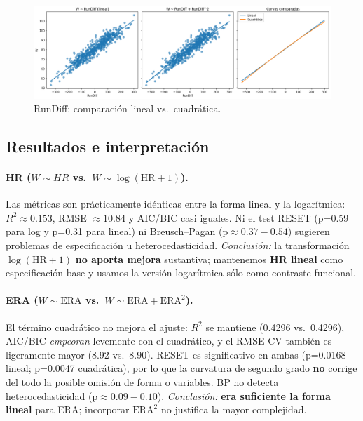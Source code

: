 \documentclass[man,floatsintext]{apa7}
\begin{document}
    \begin{figure}[H]\centering
    \includegraphics[width=\textwidth]{../plots/formas_funcionales_RunDiff.png}
    \caption{RunDiff: comparación lineal vs.\ cuadrática.}
    \label{fig:ff_rundiff}
\end{figure}

\subsection{Resultados e interpretación}

    \paragraph{HR (\(W \sim HR\) vs.\ \(W \sim \log(\text{HR}+1)\)).}
    Las métricas son prácticamente idénticas entre la forma lineal y la logarítmica: \(R^2 \approx 0.153\), RMSE \(\approx 10.84\) y AIC/BIC casi iguales. 
    Ni el test RESET (p=0.59 para log y p=0.31 para lineal) ni Breusch--Pagan (p\(\approx 0.37{-}0.54\)) sugieren problemas de especificación u heterocedasticidad. 
    \textit{Conclusión:} la transformación \(\log(\text{HR}+1)\) \textbf{no aporta mejora} sustantiva; mantenemos \textbf{HR lineal} como especificación base y usamos la versión logarítmica sólo como contraste funcional.

    \paragraph{ERA (\(W \sim \text{ERA}\) vs.\ \(W \sim \text{ERA}+\text{ERA}^2\)).}
    El término cuadrático no mejora el ajuste: \(R^2\) se mantiene (0.4296 vs.\ 0.4296), AIC/BIC \textit{empeoran} levemente con el cuadrático, y el RMSE-CV también es ligeramente mayor (8.92 vs.\ 8.90). 
    RESET es significativo en ambas (p=0.0168 lineal; p=0.0047 cuadrática), por lo que la curvatura de segundo grado \textbf{no} corrige del todo la posible omisión de forma o variables. 
    BP no detecta heterocedasticidad (p\(\approx 0.09{-}0.10\)). 
    \textit{Conclusión:} \textbf{era suficiente la forma lineal} para ERA; incorporar \(\text{ERA}^2\) no justifica la mayor complejidad.
\end{document}
